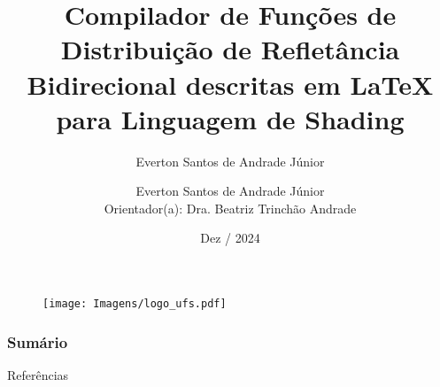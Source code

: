 \documentclass[
    9pt,               %
]{beamer}
\title[Compilador de BRDFs]{Compilador de Funções de Distribuição de Refletância Bidirecional descritas em \LaTeX{} para Linguagem de Shading}
\author[]{Everton Santos de Andrade Júnior}
\author[Everton Santos de Andrade Júnior]{Everton Santos de Andrade Júnior \\ \scriptsize{Orientador(a): Dra. Beatriz Trinchão Andrade}}
\institute[UFS]{Universidade Federal de Sergipe}
\date[2024]{Dez / 2024}
\begin{document}
\begin{frame}
    \begin{figure}
        \texttt{[image: Imagens/logo\_ufs.pdf]}
    \end{figure}
    \titlepage
\end{frame}

\begin{frame}
    \frametitle{Sumário}
    \tableofcontents
    \nocite{pbr}
\end{frame}











\begin{frame}{Referências}
    \printbibliography[heading=none]
\end{frame}


\end{document}
